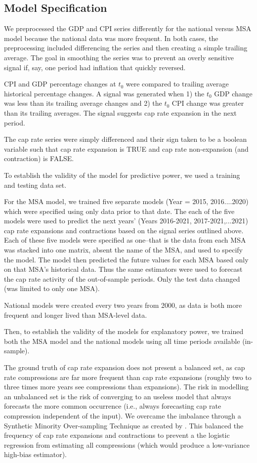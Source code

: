 \subsection{Model Specification}

We preprocessed the GDP and CPI series differently for the national versus MSA model because the national data was more frequent. In both cases, the preprocessing included differencing the series and then creating a simple trailing average. The goal in smoothing the series was to prevent an overly sensitive signal if, say, one period had inflation that quickly reversed. 

CPI and GDP percentage changes at $t_0$ were compared to trailing average historical percentage changes. A  signal was generated when 1) the $t_0$ GDP change was less than its trailing average changes and 2) the $t_0$ CPI change was greater than its trailing averages. The signal suggests cap rate expansion in the next period. 

The cap rate series were simply differenced and their sign taken to be a boolean variable such that cap rate expansion is TRUE and cap rate non-expansion (and contraction) is FALSE.

To establish the validity of the model for predictive power, we used a training and testing data set.

For the MSA model, we trained five separate models (Year = 2015, 2016....2020) which were specified using only data prior to that date. The each of the five models were used to predict the next years' (Years 2016-2021, 2017-2021,...2021) cap rate expansions and contractions based on the signal series outlined above. Each of these five models were specified as one--that is the data from each MSA was stacked into one matrix, absent the name of the MSA, and used to specify the model. The model then predicted the future values for each MSA based only on that MSA's historical data. Thus the same estimators were used to forecast the cap rate activity of the out-of-sample periods. Only the test data changed (was limited to only one MSA).

National models were created every two years from 2000, as data is both more frequent and longer lived than MSA-level data. 

Then, to establish the validity of the models for explanatory power, we trained both the MSA model and the national models using all time periods available (in-sample).

The ground truth of cap rate expansion does not present a balanced set, as cap rate compressions are far more frequent than cap rate expansions (roughly two to three times more years see compressions than expansions). The risk in modelling an unbalanced set is the risk of converging to an useless model that always forecasts the more common occurrence (i.e., always forecasting cap rate compression independent of the input). We overcame the imbalance through a Synthetic Minority Over-sampling Technique as created by \citep*{SMOTE}. This balanced the frequency of cap rate expansions and contractions to prevent a the logistic regression from estimating all compressions (which would produce a low-variance high-bias estimator).

